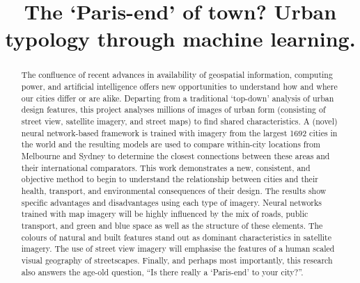 \documentclass[Crown,sageh,times]{sagej}
\begin{document}
\title{The `Paris-end' of town? Urban typology through machine learning.}









\begin{abstract}

The confluence of recent advances in availability of geospatial information, computing power, and artificial intelligence offers new opportunities to understand how and where our cities differ or are alike. Departing from a traditional `top-down' analysis of urban design features, this project analyses millions of images of urban form (consisting of street view, satellite imagery, and street maps) to find shared characteristics. A (novel) neural network-based framework is trained with imagery from the largest 1692 cities in the world and the resulting models are used to compare within-city locations from Melbourne and Sydney to determine the closest connections between these areas and their international comparators. This work demonstrates a new, consistent, and objective method to begin to understand the relationship between cities and their health, transport, and environmental consequences of their design. The results show specific advantages and disadvantages using each type of imagery. Neural networks trained with map imagery will be highly influenced by the mix of roads, public transport, and green and blue space as well as the structure of these elements. The colours of natural and built features stand out as dominant characteristics in satellite imagery. The use of street view imagery will emphasise the features of a human scaled visual geography of streetscapes. Finally, and perhaps most importantly, this research also answers the age-old question, ``Is there really a `Paris-end' to your city?''.
\end{abstract}
\end{document}
